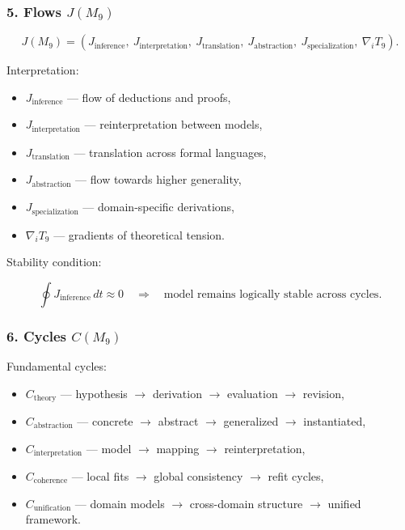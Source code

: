 \subsubsection*{5. Flows \texorpdfstring{$J(M_9)$}{J(M_9)}}

\[
J(M_9)=
(J_{\mathrm{inference}},\
J_{\mathrm{interpretation}},\
J_{\mathrm{translation}},\
J_{\mathrm{abstraction}},\
J_{\mathrm{specialization}},\
\nabla_i T_9).
\]

Interpretation:

\begin{itemize}
    \item $J_{\mathrm{inference}}$ — flow of deductions and proofs,
    \item $J_{\mathrm{interpretation}}$ — reinterpretation between models,
    \item $J_{\mathrm{translation}}$ — translation across formal languages,
    \item $J_{\mathrm{abstraction}}$ — flow towards higher generality,
    \item $J_{\mathrm{specialization}}$ — domain-specific derivations,
    \item $\nabla_i T_9$ — gradients of theoretical tension.
\end{itemize}

Stability condition:

\[
\oint J_{\mathrm{inference}}\,dt\approx 0
\quad\Rightarrow\quad
\text{model remains logically stable across cycles}.
\]

\subsubsection*{6. Cycles \texorpdfstring{$C(M_9)$}{C(M_9)}}

Fundamental cycles:

\begin{itemize}
    \item $C_{\mathrm{theory}}$
        — hypothesis $\to$ derivation $\to$ evaluation $\to$ revision,
    \item $C_{\mathrm{abstraction}}$
        — concrete $\to$ abstract $\to$ generalized $\to$ instantiated,
    \item $C_{\mathrm{interpretation}}$
        — model $\to$ mapping $\to$ reinterpretation,
    \item $C_{\mathrm{coherence}}$
        — local fits $\to$ global consistency $\to$ refit cycles,
    \item $C_{\mathrm{unification}}$
        — domain models $\to$ cross-domain structure $\to$ unified framework.
\end{itemize}


